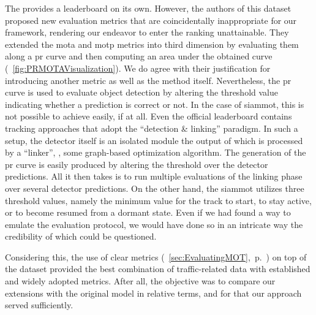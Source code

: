 The \uadetrac{} provides a leaderboard on its own. However, the authors of this dataset proposed new evaluation metrics that are coincidentally inappropriate for our framework, rendering our endeavor to enter the ranking unattainable. They extended the \gls{mota} and \gls{motp} metrics into third dimension by evaluating them along a \gls{pr} curve and then computing an area under the obtained curve (\figtext{}~\ref{fig:PRMOTAVisualization}). We do agree with their justification for introducing another metric as well as the method itself. Nevertheless, the \gls{pr} curve is used to evaluate object detection by altering the threshold value indicating whether a prediction is correct or not. In the case of \gls{siammot}, this is not possible to achieve easily, if at all. Even the official \uadetrac{} leaderboard contains tracking approaches that adopt the ``detection \& linking'' paradigm. In such a setup, the detector itself is an isolated module the output of which is processed by a ``linker'', \egtext{}, some graph-based optimization algorithm. The generation of the \gls{pr} curve is easily produced by altering the threshold over the detector predictions. All it then takes is to run multiple evaluations of the linking phase over several detector predictions. On the other hand, the \gls{siammot} utilizes three threshold values, namely the minimum value for the track to start, to stay active, or to become resumed from a dormant state. Even if we had found a way to emulate the evaluation protocol, we would have done so in an intricate way the credibility of which could be questioned.

Considering this, the use of \gls{clear} metrics (\sectiontext{}~\ref{sec:EvaluatingMOT},~p.~\pageref{sec:EvaluatingMOT}) on top of the \uadetrac{} dataset provided the best combination of traffic-related data with established and widely adopted metrics. After all, the objective was to compare our extensions with the original model in relative terms, and for that our approach served sufficiently.
